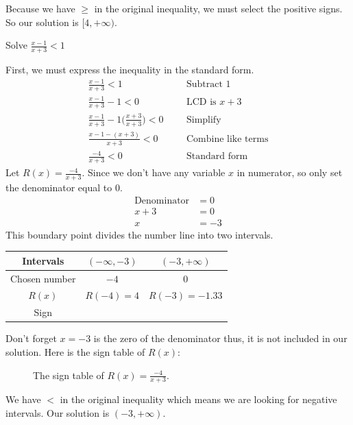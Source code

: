 Because we have $\ge$ in the original inequality, we must select the positive signs. So our solution is $[4,+\infty)$.
\begin{exa}
    Solve $\frac{x-1}{x+3} < 1$
\end{exa}
First, we must express the inequality in the standard form. 
\begin{align*}
    \frac{x-1}{x+3} < 1&        &   &\text{Subtract 1}\\
    \frac{x-1}{x+3} -1<0&       &   &\text{LCD is $x+3$}\\
    \frac{x-1}{x+3} -1\biggl(\frac{x+3}{x+3}\biggr)<0&  &   &\text{Simplify}\\
    \frac{x-1-(x+3)}{x+3}<0&        &   &\text{Combine like terms}\\
    \frac{-4}{x+3} <0&      &       &\text{Standard form}
\end{align*}
Let $R(x) = \frac{-4}{x+3}$. Since we don't have any variable $x$ in numerator, so only set the denominator equal to 0.
\begin{align*}
    \text{Denominator} &= 0 \\
    x+3 &= 0\\
    x &= -3
\end{align*}
This boundary point divides the number line into two intervals.
%
\begin{table}[ht]
\centering
\begin{tabular}{c || c  c}
    \toprule
    Intervals     & $(-\infty,-3)$   & $(-3,+\infty)$\\[1.5pt]
    \hline \hline
    Chosen number & $-4$         &  $0$ \\
    $R(x)$        & $R(-4)=4$  & $R(-3)=-1.33$\\[1.5pt]
    Sign          &\circled{$+$} &\circled{$-$}
\end{tabular}
\end{table}
%

Don't forget $x=-3$ is the zero of the denominator thus, it is not included in our solution. Here is the sign table of $R(x)$:
\begin{figure}[ht]   
    \centering
    \caption{The sign table of $R(x)= \frac{-4}{x+3}$.}
\end{figure}
%

We have $<$ in the original inequality which means we are looking for negative intervals. Our solution is $(-3,+\infty)$.
